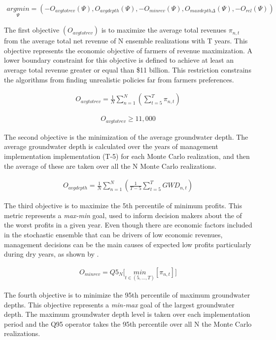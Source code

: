 \documentclass[a4paper,fleqn]{cas-sc}
\begin{document}
\begin{align}
\underset{\Psi}{argmin} = (-O_{avgtotrev}(\Psi),O_{avgdepth}(\Psi),-O_{minrev}(\Psi),O_{maxdepth\Delta}(\Psi),-O_{rel}(\Psi))
\end{align}

The first objective $(O_{avgtotrev})$ is to maximize the average total revenues $\pi_{n,t}$  from the average total net revenue of N ensemble realizations with T years. This objective represents the economic objective of farmers of revenue maximization. A lower boundary constraint for this objective is defined to achieve at least an average total revenue greater or equal than \$11 billion. This restriction constrains the algorithms from finding unrealistic policies far from farmers preferences. 

\begin{align}
O_{avgtotrev} = \frac{1}{N}\sum_{n=1}^N(\sum_{t=5}^T \pi_{n,t})
\end{align}


\begin{align}
O_{avgtotrev} \geq 11,000
\end{align}

The second objective is the minimization of the average groundwater depth. The average groundwater depth is calculated over the years of management implementation implementation (T-5) for each Monte Carlo realization, and then the average of these are taken over all the N Monte Carlo realizations. 

\begin{align}
O_{avgdepth} = \frac{1}{N}\sum_{n=1}^N(\frac{1}{T-5}\sum_{t=5}^T GWD_{n,t})
\end{align}

The third objective is to maximize the 5th percentile of minimum profits. This metric represents a \textit{max-min} goal, used to inform decision makers about the of the worst profits in a given year. Even though there are economic factors included in the stochastic ensemble that can be drivers of low economic revenues, management decisions can be the main causes of expected low profits particularly during dry years, as shown by \citet{rodriguez-flores_global_2022}. 

\begin{align}
O_{minrev} = Q5_{N} \bigg[\underset{t\in(5,...,T)}{min}[\pi_{n,t}]\bigg]
\end{align}

The fourth objective is to minimize the 95th percentile of maximum groundwater depths. This objective represents a \textit{min-max} goal of the largest groundwater depth. The maximum groundwater depth level is taken over each implementation period and the Q95 operator takes the 95th percentile over all N the Monte Carlo  realizations. 
\end{document}
